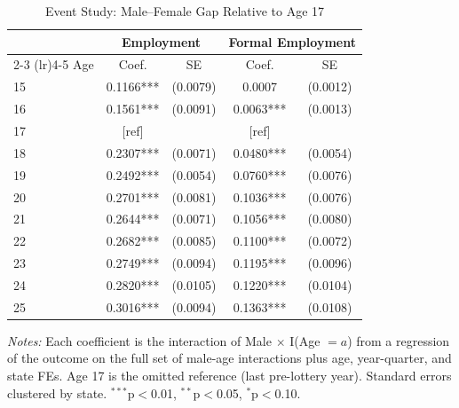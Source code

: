 \begin{table}[t]
\centering
\caption{Event Study: Male--Female Gap Relative to Age 17\label{tab:event_study}}
\small
\begin{tabular}{lcccc}
\toprule
 & \multicolumn{2}{c}{Employment} & \multicolumn{2}{c}{Formal Employment} \\
\cmidrule(lr){2-3} \cmidrule(lr){4-5}
Age & Coef. & SE & Coef. & SE \\
\midrule
15 & 0.1166*** & (0.0079) & 0.0007 & (0.0012) \\
16 & 0.1561*** & (0.0091) & 0.0063*** & (0.0013) \\
17 & [ref] & & [ref] & \\
\midrule
18 & 0.2307*** & (0.0071) & 0.0480*** & (0.0054) \\
\midrule
19 & 0.2492*** & (0.0054) & 0.0760*** & (0.0076) \\
20 & 0.2701*** & (0.0081) & 0.1036*** & (0.0076) \\
21 & 0.2644*** & (0.0071) & 0.1056*** & (0.0080) \\
22 & 0.2682*** & (0.0085) & 0.1100*** & (0.0072) \\
23 & 0.2749*** & (0.0094) & 0.1195*** & (0.0096) \\
24 & 0.2820*** & (0.0105) & 0.1220*** & (0.0104) \\
25 & 0.3016*** & (0.0094) & 0.1363*** & (0.0108) \\
\bottomrule
\end{tabular}
\begin{tablenotes}
\footnotesize
\item \textit{Notes:} Each coefficient is the interaction of Male $\times$ I(Age $= a$) from a regression of the outcome on the full set of male-age interactions plus age, year-quarter, and state FEs. Age 17 is the omitted reference (last pre-lottery year). Standard errors clustered by state. $^{***}$p$<$0.01, $^{**}$p$<$0.05, $^{*}$p$<$0.10.
\end{tablenotes}
\end{table}
